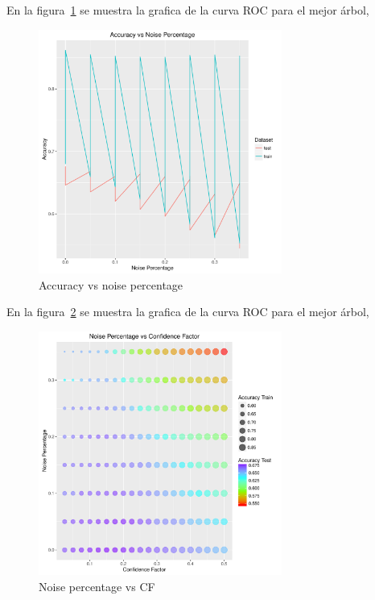 En la figura~\ref{fig:5c} se muestra la grafica de la curva ROC para el mejor árbol,

\begin{figure}
  \centering
  \includegraphics[width = 8cm]{5c.pdf}
  \caption{Accuracy vs noise percentage}
  \label{fig:5c}
\end{figure}

En la figura~\ref{fig:5d} se muestra la grafica de la curva ROC para el mejor árbol,


\begin{figure}
  \centering
  \includegraphics[width = 8cm]{5d.pdf}
  \caption{Noise percentage vs CF}
  \label{fig:5d}
\end{figure}

